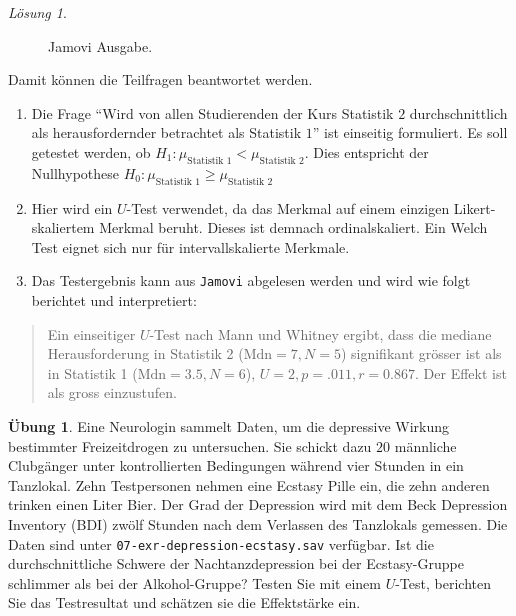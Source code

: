 \documentclass[
]{book}
\providecommand{\tightlist}{%
  \setlength{\itemsep}{0pt}\setlength{\parskip}{0pt}}
\theoremstyle{definition}
\theoremstyle{definition}
\theoremstyle{definition}
\newtheorem{exercise}{Übung}[chapter]
\theoremstyle{definition}
\theoremstyle{remark}
\newtheorem*{solution}{Lösung}
\begin{document}
\begin{solution}
\begin{figure}
{}

\caption{Jamovi Ausgabe.}\label{fig:sol-statistik-herausforderung-output}
\end{figure}

Damit können die Teilfragen beantwortet werden.

\begin{enumerate}
\def\labelenumi{\alph{enumi})}
\tightlist
\item
  Die Frage ``Wird von allen Studierenden der Kurs Statistik \(2\)
  durchschnittlich als herausfordernder betrachtet als Statistik \(1\)''
  ist einseitig formuliert. Es soll getestet werden, ob
  \(H_1: \mu_\text{Statistik 1} < \mu_\text{Statistik 2}\). Dies
  entspricht der Nullhypothese
  \(H_0: \mu_\text{Statistik 1} \geq \mu_\text{Statistik 2}\)
\item
  Hier wird ein \(U\)-Test verwendet, da das Merkmal auf einem einzigen
  Likert-skaliertem Merkmal beruht. Dieses ist demnach
  ordinalskaliert. Ein Welch Test eignet sich nur für
  intervallskalierte Merkmale.
\item
  Das Testergebnis kann aus \texttt{Jamovi} abgelesen werden und wird wie
  folgt berichtet und interpretiert:
\end{enumerate}

\begin{quote}
Ein einseitiger \(U\)-Test nach Mann und Whitney ergibt, dass die
mediane Herausforderung in Statistik 2 (\(\text{Mdn}=7, N = 5\))
signifikant grösser ist als in Statistik 1 (\(\text{Mdn}= 3.5, N =6\)),
\(U = 2, p = .011, r = 0.867\). Der Effekt ist als gross einzustufen.
\end{quote}

\end{solution}

\begin{exercise}
\protect\hypertarget{exr:depression-ecstasy}{}\label{exr:depression-ecstasy}Eine Neurologin sammelt Daten, um die depressive Wirkung bestimmter
Freizeitdrogen zu untersuchen. Sie schickt dazu \(20\) männliche
Clubgänger unter kontrollierten Bedingungen während vier Stunden in ein
Tanzlokal. Zehn Testpersonen nehmen eine Ecstasy Pille ein, die zehn
anderen trinken einen Liter Bier. Der Grad der Depression wird mit dem
Beck Depression Inventory (BDI) zwölf Stunden nach dem Verlassen des
Tanzlokals gemessen. Die Daten sind unter
\texttt{07-exr-depression-ecstasy.sav} verfügbar. Ist die
durchschnittliche Schwere der Nachtanzdepression bei der Ecstasy-Gruppe
schlimmer als bei der Alkohol-Gruppe? Testen Sie mit einem \(U\)-Test,
berichten Sie das Testresultat und schätzen sie die Effektstärke ein.
\end{exercise}
\end{document}
